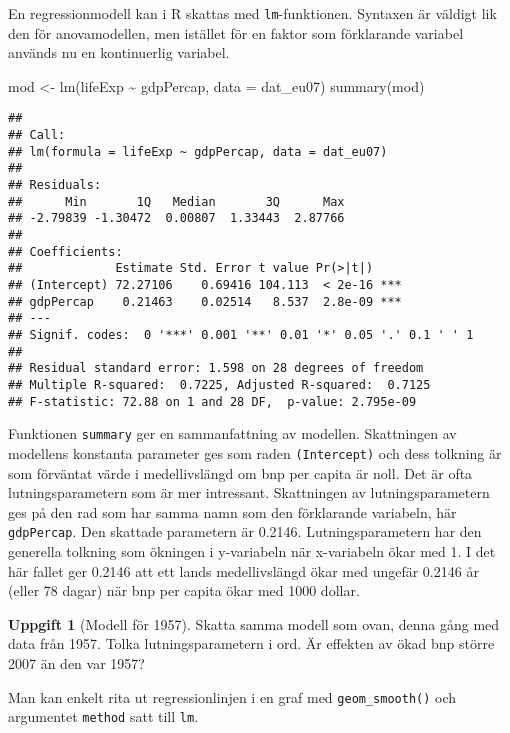 \documentclass[
]{book}
\newenvironment{Shaded}{\begin{snugshade}}{\end{snugshade}}
\newcommand{\AttributeTok}[1]{\textcolor[rgb]{0.77,0.63,0.00}{#1}}
\newcommand{\FunctionTok}[1]{\textcolor[rgb]{0.00,0.00,0.00}{#1}}
\newcommand{\NormalTok}[1]{#1}
\newcommand{\OtherTok}[1]{\textcolor[rgb]{0.56,0.35,0.01}{#1}}
\newcommand{\SpecialCharTok}[1]{\textcolor[rgb]{0.00,0.00,0.00}{#1}}
\theoremstyle{definition}
\theoremstyle{definition}
\theoremstyle{definition}
\newtheorem{exercise}{Uppgift}[chapter]
\theoremstyle{definition}
\theoremstyle{remark}
\begin{document}
En regressionmodell kan i R skattas med \texttt{lm}-funktionen. Syntaxen är väldigt lik den för anovamodellen, men istället för en faktor som förklarande variabel används nu en kontinuerlig variabel.

\begin{Shaded}
\begin{Highlighting}[]
\NormalTok{mod }\OtherTok{\textless{}{-}} \FunctionTok{lm}\NormalTok{(lifeExp }\SpecialCharTok{\textasciitilde{}}\NormalTok{ gdpPercap, }\AttributeTok{data =}\NormalTok{ dat\_eu07)}
\FunctionTok{summary}\NormalTok{(mod)}
\end{Highlighting}
\end{Shaded}

\begin{verbatim}
## 
## Call:
## lm(formula = lifeExp ~ gdpPercap, data = dat_eu07)
## 
## Residuals:
##      Min       1Q   Median       3Q      Max 
## -2.79839 -1.30472  0.00807  1.33443  2.87766 
## 
## Coefficients:
##             Estimate Std. Error t value Pr(>|t|)    
## (Intercept) 72.27106    0.69416 104.113  < 2e-16 ***
## gdpPercap    0.21463    0.02514   8.537  2.8e-09 ***
## ---
## Signif. codes:  0 '***' 0.001 '**' 0.01 '*' 0.05 '.' 0.1 ' ' 1
## 
## Residual standard error: 1.598 on 28 degrees of freedom
## Multiple R-squared:  0.7225, Adjusted R-squared:  0.7125 
## F-statistic: 72.88 on 1 and 28 DF,  p-value: 2.795e-09
\end{verbatim}

Funktionen \texttt{summary} ger en sammanfattning av modellen. Skattningen av modellens konstanta parameter ges som raden \texttt{(Intercept)} och dess tolkning är som förväntat värde i medellivslängd om bnp per capita är noll. Det är ofta lutningsparametern som är mer intressant. Skattningen av lutningsparametern ges på den rad som har samma namn som den förklarande variabeln, här \texttt{gdpPercap}. Den skattade parametern är 0.2146. Lutningsparametern har den generella tolkning som ökningen i y-variabeln när x-variabeln ökar med 1. I det här fallet ger 0.2146 att ett lands medellivslängd ökar med ungefär 0.2146 år (eller 78 dagar) när bnp per capita ökar med 1000 dollar.

\begin{exercise}[Modell för 1957]
Skatta samma modell som ovan, denna gång med data från 1957. Tolka lutningsparametern i ord. Är effekten av ökad bnp större 2007 än den var 1957?
\end{exercise}

Man kan enkelt rita ut regressionlinjen i en graf med \texttt{geom\_smooth()} och argumentet \texttt{method} satt till \texttt{lm}.
\end{document}
